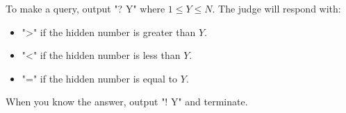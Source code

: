 To make a query, output "? Y" where $1 \le Y \le N$. The judge will respond with:
\begin{itemize}
    \item ">" if the hidden number is greater than $Y$.
    \item "<" if the hidden number is less than $Y$.
    \item "=" if the hidden number is equal to $Y$.
\end{itemize}

When you know the answer, output "! Y" and terminate.

